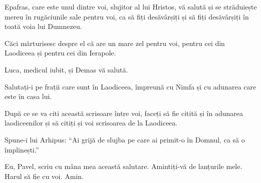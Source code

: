{\par }{\PP {}Epafras, care este unul dintre voi, slujitor al lui Hristos, vă salută și se străduiește mereu în rugăciunile sale pentru voi, ca să fiți desăvârșiți și să fiți desăvârșiți în toată voia lui Dumnezeu.

Căci mărturisesc despre el că are un mare zel pentru voi, pentru cei din Laodiceea și pentru cei din Ierapole.

Luca, medicul iubit, și Demas vă salută.

Salutați-i pe frații care sunt în Laodiceea, împreună cu Nimfa și cu adunarea care este în casa lui.

După ce se va citi această scrisoare între voi, faceți să fie citită și în adunarea laodiceenilor și să citiți și voi scrisoarea de la Laodiceea.

Spune-i lui Arhipus: “Ai grijă de slujba pe care ai primit-o în Domnul, ca să o împlinești.”


\par }{\PP {}Eu, Pavel, scriu cu mâna mea această salutare. Amintiți-vă de lanțurile mele. Harul să fie cu voi. Amin.


\par }